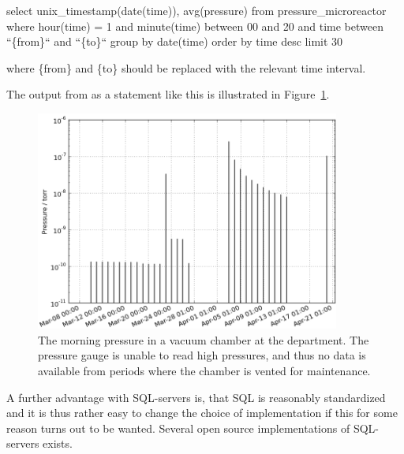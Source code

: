 select unix\_timestamp(date(time)), avg(pressure) from pressure\_microreactor
where hour(time) = 1 and minute(time) between 00 and 20 and time between
``\{from\}`` and ``\{to\}`` group by date(time) order by time desc limit 30

where \{from\}  and \{to\} should be replaced with the relevant time interval.

The output from as a statement like this is illustrated in
Figure~\ref{fig:morning_pressure}. 

\begin{figure}
 \begin{center}
 \includegraphics[width=10cm]{morning_pressure.png}
 \caption{ The morning pressure in a vacuum chamber at the department. The
   pressure gauge is unable to read high pressures, and thus no data is
   available from periods where the chamber is vented for maintenance.
   \label{fig:morning_pressure}
 } 
 \end{center}
\end{figure}

A further advantage with SQL-servers is, that SQL is reasonably standardized
and it is thus rather easy to change the choice of implementation if this for
some reason turns out to be wanted.  Several open source implementations of
SQL-servers exists.



